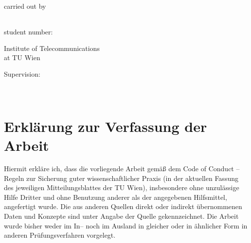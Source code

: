 \begin{titlepage}
	\begin{center}
		carried out by \\
		\smallskip
		\begin{large}\textbf{\author}\end{large} \\ 
		student number: \MatriculationNumber
		\smallskip
		\\
	\end{center}
	
	\vfill
	
	\begin{flushleft}
		Institute of Telecommunications\\
		\smallskip
		at TU Wien\\
	\end{flushleft}
	
	\begin{flushleft}
		Supervision: \\ 
		\profA \\
		\profB \\
	\end{flushleft}
	\newpage
	
	
\end{titlepage}

 	
\thispagestyle{empty} %
	\section*{Erklärung zur Verfassung der Arbeit }
	Hiermit erkläre ich, dass die vorliegende Arbeit gemäß dem Code of Conduct – Regeln zur Sicherung
	guter wissenschaftlicher Praxis (in der aktuellen Fassung des jeweiligen Mitteilungsblattes der TU
	Wien), insbesondere ohne unzulässige Hilfe Dritter und ohne Benutzung anderer als der
	angegebenen Hilfsmittel, angefertigt wurde. Die aus anderen Quellen direkt oder indirekt
	übernommenen Daten und Konzepte sind unter Angabe der Quelle gekennzeichnet.
	Die Arbeit wurde bisher weder im In– noch im Ausland in gleicher oder in ähnlicher Form in anderen
Prüfungsverfahren vorgelegt.
	


